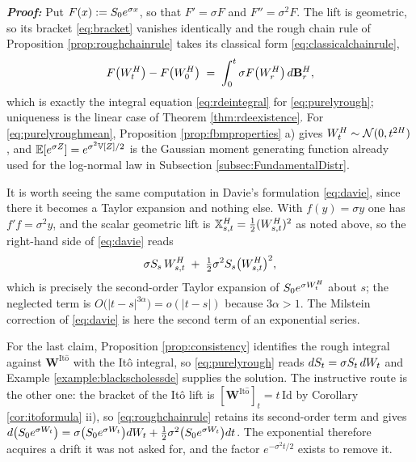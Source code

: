 \textbf{\textit{Proof:}} Put $F(x) := S_0 e^{\sigma x}$, so that $F' = \sigma F$ and
$F'' = \sigma^2F$. The lift is geometric, so its bracket \eqref{eq:bracket} vanishes identically and
the rough chain rule of Proposition \ref{prop:roughchainrule} takes its classical form
\eqref{eq:classicalchainrule},
\[
F\bigl(W^{H}_t\bigr) - F\bigl(W^{H}_0\bigr) \;=\; \int_0^t \sigma F\bigl(W^{H}_r\bigr)\,d\mathbf{B}^{H}_r ,
\]
which is exactly the integral equation \eqref{eq:rdeintegral} for \eqref{eq:purelyrough}; uniqueness
is the linear case of Theorem \ref{thm:rdeexistence}. For \eqref{eq:purelyroughmean}, Proposition
\ref{prop:fbmproperties} a) gives $W^{H}_t \sim \mathcal{N}(0,t^{2H})$, and
$\mathbb{E}[e^{\sigma Z}] = e^{\sigma^2\mathbb{V}[Z]/2}$ is the Gaussian moment generating function already used
for the log-normal law in Subsection \ref{subsec:FundamentalDistr}.

It is worth seeing the same computation in Davie's formulation \eqref{eq:davie}, since there it
becomes a Taylor expansion and nothing else. With $f(y) = \sigma y$ one has $f'f = \sigma^2 y$, and
the scalar geometric lift is $\mathbb{X}^{H}_{s,t} = \tfrac12(W^{H}_{s,t})^2$ as noted above, so the
right-hand side of \eqref{eq:davie} reads
\[
\sigma S_s\,W^{H}_{s,t} \;+\; \tfrac12\sigma^2S_s\bigl(W^{H}_{s,t}\bigr)^2 ,
\]
which is precisely the second-order Taylor expansion of $S_0e^{\sigma W^{H}_t}$ about $s$; the
neglected term is $O\bigl(|t-s|^{3\alpha}\bigr) = o(|t-s|)$ because $3\alpha>1$. The Milstein
correction of \eqref{eq:davie} is here the second term of an exponential series.

For the last claim, Proposition \ref{prop:consistency} identifies the rough integral against
$\mathbf{W}^{\mathrm{It\hat o}}$ with the Itô integral, so \eqref{eq:purelyrough} reads
$dS_t = \sigma S_t\,d W_t$ and Example \ref{example:blackscholessde} supplies the
solution. The instructive route is the other one: the bracket of the Itô lift is
$[\mathbf{W}^{\mathrm{It\hat o}}]_t = t\,\mathrm{Id}$ by Corollary \ref{cor:itoformula} ii), so
\eqref{eq:roughchainrule} retains its second-order term and gives
$d\bigl(S_0e^{\sigma W_t}\bigr) = \sigma\bigl(S_0e^{\sigma W_t}\bigr)d W_t
+ \tfrac12\sigma^2\bigl(S_0e^{\sigma W_t}\bigr)d t$. The exponential therefore acquires a
drift it was not asked for, and the factor $e^{-\sigma^2t/2}$ exists to remove it.
\qedfilledtext

\medskip


